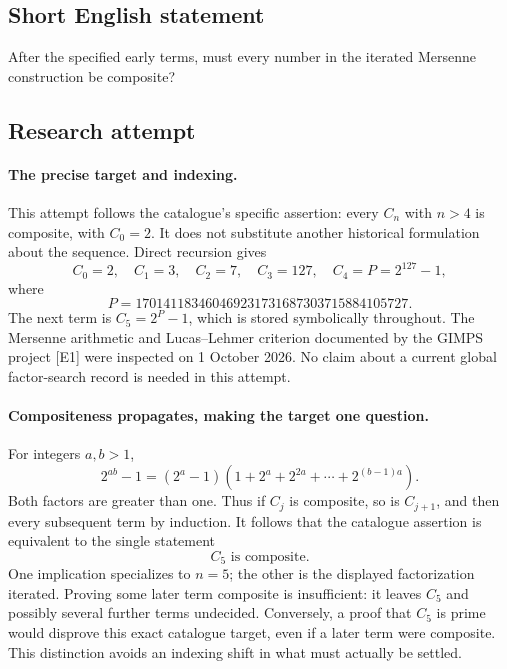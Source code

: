 \documentclass[11pt,a4paper]{article}
\begin{document}
\subsection{Short English statement}

After the specified early terms, must every number in the iterated Mersenne construction be composite?

\subsection{Research attempt}

\paragraph{The precise target and indexing.}
This attempt follows the catalogue's specific assertion: every $C_n$
with $n>4$ is composite, with $C_0=2$. It does not substitute another
historical formulation about the sequence. Direct recursion gives
\[
 C_0=2,\quad C_1=3,\quad C_2=7,\quad C_3=127,\quad
 C_4=P=2^{127}-1,
\]
where
\[
 P=170141183460469231731687303715884105727.
\]
The next term is $C_5=2^P-1$, which is stored symbolically throughout.
The Mersenne arithmetic and Lucas--Lehmer criterion documented by the
GIMPS project [E1] were inspected on 1 October 2026. No claim about a
current global factor-search record is needed in this attempt.

\paragraph{Compositeness propagates, making the target one question.}
For integers $a,b>1$,
\[
 2^{ab}-1=(2^a-1)(1+2^a+2^{2a}+\cdots+2^{(b-1)a}).
\]
Both factors are greater than one. Thus if $C_j$ is composite, so is
$C_{j+1}$, and then every subsequent term by induction. It follows that
the catalogue assertion is equivalent to the single statement
\[
                         C_5\text{ is composite}.
\]
One implication specializes to $n=5$; the other is the displayed
factorization iterated. Proving some later term composite is insufficient:
it leaves $C_5$ and possibly several further terms undecided. Conversely,
a proof that $C_5$ is prime would disprove this exact catalogue target,
even if a later term were composite. This distinction avoids an indexing
shift in what must actually be settled.
\end{document}
